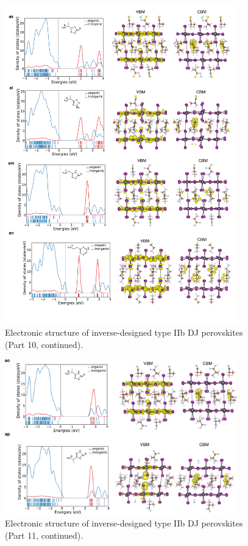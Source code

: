 \begin{figure}[htbp]
    \ContinuedFloat
    \centering
    \includegraphics[width=0.9\textwidth]{figures/synthesis-feasibility/figure5-25-10.png}
    \caption{Electronic structure of inverse-designed type IIb DJ perovskites (Part 10, continued).}
\end{figure}

\begin{figure}[htbp]
    \ContinuedFloat
    \centering
    \includegraphics[width=0.9\textwidth]{figures/synthesis-feasibility/figure5-25-11.png}
    \caption{Electronic structure of inverse-designed type IIb DJ perovskites (Part 11, continued).}
\end{figure}

